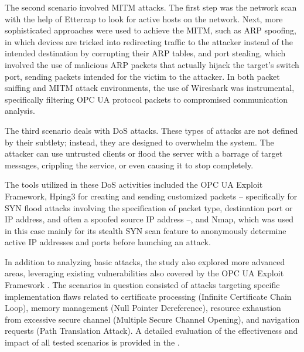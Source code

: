 \documentclass[pdflatex,sn-mathphys-num,iicol]{sn-jnl}%
\begin{document}
The second scenario involved MITM attacks. The first step was the network scan with the help of Ettercap to look for active hosts on the network. Next, more sophisticated approaches were used to achieve the MITM, such as ARP spoofing, in which devices are tricked into redirecting traffic to the attacker instead of the intended destination by corrupting their ARP tables, and port stealing, which involved the use of malicious ARP packets that actually hijack the target's switch port, sending packets intended for the victim to the attacker. In both packet sniffing and MITM attack environments, the use of Wireshark was instrumental, specifically filtering OPC UA protocol packets to compromised communication analysis.

The third scenario deals with DoS attacks. These types of attacks are not defined by their subtlety; instead, they are designed to overwhelm the system. The attacker can use untrusted clients or flood the server with a barrage of target messages, crippling the service, or even causing it to stop completely.

The tools utilized in these DoS activities included the OPC UA Exploit Framework, Hping3 for creating and sending customized packets -- specifically for SYN flood attacks involving the specification of packet type, destination port or IP address, and often a spoofed source IP address --, and Nmap, which was used in this case mainly for its stealth SYN scan feature to anonymously determine active IP addresses and ports before launching an attack.

In addition to analyzing basic attacks, the study also explored more advanced areas, leveraging existing vulnerabilities also covered by the OPC UA Exploit Framework \cite{claroty2023}. The scenarios in question consisted of attacks targeting specific implementation flaws related to certificate processing (Infinite Certificate Chain Loop), memory management (Null Pointer Dereference), resource exhaustion from excessive secure channel (Multiple Secure Channel Opening), and navigation requests (Path Translation Attack). A detailed evaluation of the effectiveness and impact of all tested scenarios is provided in the .
\end{document}
